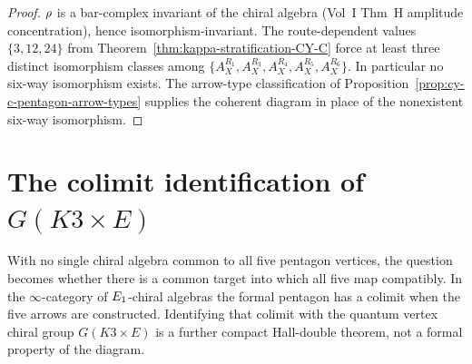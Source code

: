 \begin{proof}
$\rho$ is a bar-complex invariant of the chiral algebra (Vol~I Thm~H amplitude concentration), hence
isomorphism-invariant. The route-dependent values $\{3, 12, 24\}$ from Theorem~\ref{thm:kappa-stratification-CY-C}
force at least three distinct isomorphism classes among $\{A_X^{R_1}, A_X^{R_3}, A_X^{R_4}, A_X^{R_5}, A_X^{R_6}\}$.
In particular no six-way isomorphism exists. The arrow-type classification of
Proposition~\ref{prop:cy-c-pentagon-arrow-types} supplies the coherent diagram in place of the nonexistent
six-way isomorphism.
\end{proof}

\section{The colimit identification of \texorpdfstring{$G(K3 \times E)$}{G(K3 x E)}}
\label{sec:cy-c-gl-colimit}

With no single chiral algebra common to all five pentagon vertices, the question becomes whether there is a
common target into which all five map compatibly. In the $\infty$-category of $E_{1}$-chiral algebras the
formal pentagon has a colimit when the five arrows are constructed. Identifying that colimit with the quantum
vertex chiral group $G(K3 \times E)$ is a further compact Hall-double theorem, not a formal property of the
diagram.

